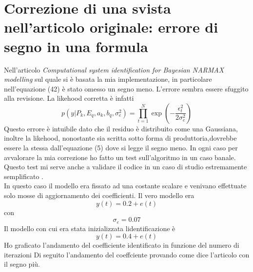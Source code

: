 \section*{Correzione di una svista nell'articolo originale: errore di segno in una formula}
Nell'articolo \emph{Computational system identification for Bayesian
NARMAX modelling} sul quale si è basata la mia implementazione, in particolare nell'equazione (42) è stato omesso un segno meno.
L'errore sembra essere sfuggito alla revisione.
La likehood corretta è infatti
\[p(y|P_k,E_q,a_k,b_q,\sigma_e^2)=\prod_{t=1}^N \exp \left(-\frac{\epsilon_t^2}{2\sigma_e^2}\right)\]
Questo errore è intuibile dato che il residuo è distribuito come una Gaussiana,
inoltre la likehood, nonostante sia scritta sotto forma di produttoria,dovrebbe essere la stessa dall'equazione (5) dove si legge il segno meno. In ogni caso per avvalorare la mia correzione ho  fatto un test sull'algoritmo in un caso banale. Questo test mi serve anche a validare il codice in un caso di studio estremamente semplificato .
\\
In questo caso il modello era fissato ad una costante scalare e venivano effettuate solo mosse di aggiornamento dei coefficienti.
Il vero modello era
\[y(t)=0.2+e(t)\]
con
\[\sigma_e= 0.07\]
Il modello con cui era stata inizializzata lidentificazione è
\[y(t)=0.4+e(t)\]
Ho graficato l'andamento del coefficiente identificato in funzione del numero di iterazioni
Di seguito l'andamento del coeffciente provando come dice l'articolo con il segno più.\\
